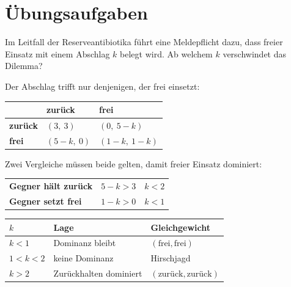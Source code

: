 \section{Übungsaufgaben}

\begin{aufgabe}
Im Leitfall der Reserveantibiotika führt eine Meldepflicht dazu, dass freier Einsatz mit einem Abschlag $k$ belegt wird. Ab welchem $k$ verschwindet das Dilemma?

\loesung
{}
Der Abschlag trifft nur denjenigen, der frei einsetzt:
\begin{center}
{\small
\renewcommand{\arraystretch}{1.6}
\begin{tabular}{@{}P{2.4cm}P{2.6cm}P{2.6cm}@{}}
\toprule
& \textbf{zurück} & \textbf{frei}\\
\midrule
\textbf{zurück} & $(3,\ 3)$ & $(0,\ 5-k)$\\
\textbf{frei} & $(5-k,\ 0)$ & $(1-k,\ 1-k)$\\
\bottomrule
\end{tabular}}
\end{center}

Zwei Vergleiche müssen beide gelten, damit freier Einsatz dominiert:
\begin{center}
{\small
\renewcommand{\arraystretch}{1.5}
\begin{tabular}{@{}P{2.8cm}P{3.0cm}P{2.4cm}@{}}
\toprule
\textbf{Gegner hält zurück} & $5-k > 3$ & $k < 2$\\
\textbf{Gegner setzt frei} & $1-k > 0$ & $k < 1$\\
\bottomrule
\end{tabular}}
\end{center}

\begin{center}
{\small
\renewcommand{\arraystretch}{1.5}
\begin{tabular}{@{}P{1.8cm}P{3.4cm}P{2.6cm}@{}}
\toprule
$k$ & \textbf{Lage} & \textbf{Gleichgewicht}\\
\midrule
$k<1$ & Dominanz bleibt & $(\text{frei},\text{frei})$\\
$1<k<2$ & keine Dominanz & \textcolor{mittel}{Hirschjagd}\\
$k>2$ & Zurückhalten dominiert & $(\text{zurück},\text{zurück})$\\
\bottomrule
\end{tabular}}
\end{center}


\end{aufgabe}
